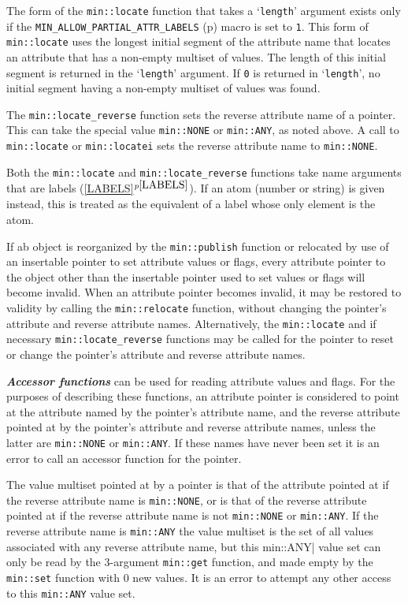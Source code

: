 \documentclass[12pt]{article}
\newcommand{\ikey}[2]{{\bf \em #1}\index{#2}}
\newcommand{\itemref}[1]{\ref{#1}$^{p\pageref{#1}}$}
\newcommand{\pagref}[1]{p\pageref{#1}}
\newcommand{\EOL}{\penalty \exhyphenpenalty}
\begin{document}
The form of the {\tt min::\EOL locate} function that takes a `{\tt length}'
argument exists only if the
{\tt MIN\_\EOL ALLOW\_\EOL PARTIAL\_\EOL ATTR\_\EOL LABELS}
(\pagref{MIN_ALLOW_PARTIAL_ATTR_LABELS}) macro is set to {\tt 1}.
This form of {\tt min::\EOL locate} uses the longest initial segment of the
attribute name that locates an attribute that has a non-empty
multiset of values.  The
length of this initial segment is returned in the `\verb|length|'
argument.  If \verb|0| is returned in `\verb|length|',
no initial segment having a non-empty multiset of values was found.

The {\tt min::\EOL locate\_reverse} function sets the reverse attribute name of
a pointer.  This can take the special value {\tt min::NONE} or
{\tt min::ANY}, as noted above.  A call to {\tt min::\EOL locate} or
{\tt min::\EOL locatei} sets the
reverse attribute name to {\tt min::NONE}.

Both the {\tt min::\EOL locate} and {\tt min::\EOL locate\_reverse}
functions take name
arguments that are labels (\itemref{LABELS}).  If an atom (number or
string) is given instead, this is treated as the equivalent of
a label whose only element is the atom.

If ab object is reorganized by the \verb|min::publish| function or
relocated by use of an insertable pointer to set attribute values or
flags, every attribute pointer to the object other than the insertable
pointer used to set values or flags will become invalid.
When an attribute pointer becomes invalid, it may be restored to
validity by calling the {\tt min::\EOL relocate} function, without
changing the pointer's attribute and reverse attribute names.  Alternatively,
the {\tt min::\EOL locate} and if necessary {\tt min::\EOL locate\_reverse}
functions may be called for the pointer to reset or change
the pointer's attribute and reverse attribute names.

\ikey{Accessor functions}{accessor function}
can be used for reading attribute values and flags.
For the purposes of describing these functions,
an attribute pointer is considered to point at the attribute
named by the pointer's attribute name, and the reverse attribute
pointed at by the pointer's attribute and reverse attribute names,
unless the latter are \verb|min::NONE| or \verb|min::ANY|.
If these names have never been set it is an error to call an accessor
function for the pointer.

The value multiset pointed at by a pointer is that of the attribute pointed
at if the reverse attribute name is \verb|min::NONE|, or is that of
the reverse attribute pointed at if the reverse attribute name is not
\verb|min::NONE| or \verb|min::ANY|.
If the reverse attribute name is \verb|min::ANY| the value multiset is
the set of all values associated with any reverse attribute name, but
this \verb||min::ANY|
value set can only be read by the 3-argument \verb|min::get|
function, and made empty by the \verb|min::set| function with 0 new values.
It is an error to attempt any other access to this \verb|min::ANY| value set.
\end{document}
